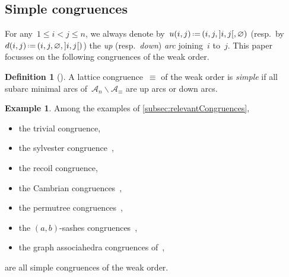 \documentclass{amsart}
\theoremstyle{definition}
\newtheorem{definition}[theorem]{Definition}
\newtheorem{example}[theorem]{Example}
\newtheorem{remark}[theorem]{Remark}
\newcommand{\ssm}{\smallsetminus} %
\newcommand{\eqdef}{\mbox{\,\raisebox{0.2ex}{\scriptsize\ensuremath{\mathrm:}}\ensuremath{=}\,}} %
\newcommand{\darkblue}{\color{darkblue}} %
\newcommand{\defn}[1]{\textsl{\darkblue #1}} %
\newcommand{\arc}{\alpha} %
\newcommand{\arcs}{{\mathcal{A}}} %
\begin{document}

\subsection{Simple congruences}
\label{subsec:simpleCongruences}

For any~$1 \le i < j \le n$, we always denote by~$u(i,j) \eqdef (i, j, {]i,j[}, \varnothing)$ (resp.~by~$d(i,j) \eqdef (i, j, \varnothing, {]i,j[})$) the \defn{up} (resp.~\defn{down}) \defn{arc} joining~$i$ to~$j$.
This paper focusses on the following congruences of the weak order.

\begin{definition}[{\cite[Sect.~4.4]{HoangMutze}}]
\label{def:simpleCongruence}
A lattice congruence~$\equiv$ of the weak order is \defn{simple} if all subarc minimal arcs of~$\arcs_n \ssm \arcs_\equiv$ are up arcs or down arcs.
\end{definition}


\begin{example}
Among the examples of \cref{subsec:relevantCongruences},
\begin{itemize}
\item the trivial congruence,
\item the sylvester congruence~\cite{Tonks, HivertNovelliThibon-algebraBinarySearchTrees},
\item the recoil congruence,
\item the Cambrian congruences~\cite{Reading-CambrianLattices, ChatelPilaud},
\item the permutree congruences~\cite{PilaudPons-permutrees},
\item the $(a,b)$-sashes congruences~\cite{Law,LaniniNovelli},
\item the graph associahedra congruences of~\cite{BarnardMcConville},
\end{itemize}
are all simple congruences of the weak order.
\end{example}
\end{document}
